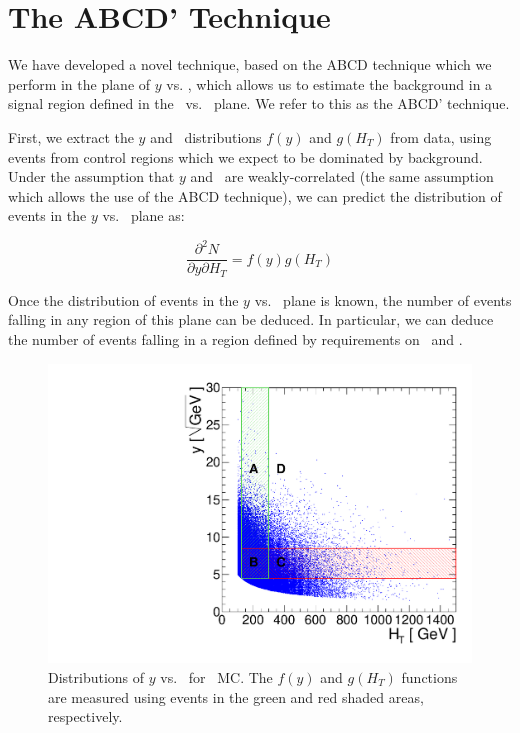 \newpage

\section{The ABCD' Technique}
\label{app:abcdprime}

We have developed a novel technique, based on the ABCD technique which we perform
in the plane of $y$ vs. \Ht, which allows us to estimate the background in a signal
region defined in the \met\ vs. \Ht\ plane. We refer to this as the ABCD' technique.

First, we extract the $y$ and \Ht\ distributions $f(y)$ and $g(H_T)$ from data, using 
events from control regions which we expect to be dominated by background. Under the assumption
that $y$ and \Ht\ are weakly-correlated (the same assumption which allows the use of
the ABCD technique), we can predict the distribution of events in the $y$ vs. \Ht\ plane as:

\begin{equation}
\frac{\partial^2 N}{\partial y \partial H_T} = f(y)g(H_T)
\end{equation}

Once the distribution of events in the $y$ vs. \Ht\ plane is known, the number of events
falling in any region of this plane can be deduced. In particular, we can deduce the
number of events falling in a region defined by requirements on \met\ and \Ht.


\begin{figure}[tbh]
\begin{center}
\includegraphics[width=0.6\linewidth]{plots/abcdprime.pdf}
\caption{\label{fig:abcdprime}\protect Distributions of $y$ 
vs. \Ht\ for \ttbar\ MC. The $f(y)$ and $g(H_T)$ functions are
measured using events in the green and red shaded areas, respectively.}
\end{center}
\end{figure}

